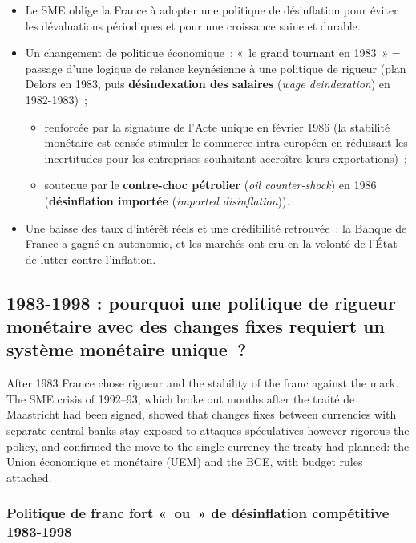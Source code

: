 \begin{itemize}
  \item Le SME oblige la France à adopter une politique de désinflation pour éviter les
    dévaluations périodiques et pour une croissance saine et durable.
  \item Un changement de politique économique~: «~le grand tournant en 1983~» = passage
    d'une logique de relance keynésienne à une politique de rigueur (plan Delors en
    1983, puis \textbf{désindexation des salaires} (\textit{wage deindexation}) en
    1982-1983)~;
    \begin{itemize}
      \item renforcée par la signature de l'Acte unique en février 1986 (la stabilité
        monétaire est censée stimuler le commerce intra-européen en réduisant les
        incertitudes pour les entreprises souhaitant accroître leurs exportations)~;
      \item soutenue par le \textbf{contre-choc pétrolier} (\textit{oil counter-shock})
        en 1986 (\textbf{désinflation importée} (\textit{imported disinflation})).
    \end{itemize}
  \item Une baisse des taux d'intérêt réels et une crédibilité retrouvée~: la Banque de
    France a gagné en autonomie, et les marchés ont cru en la volonté de l'État de
    lutter contre l'inflation.
\end{itemize}

\subsection{1983-1998 : pourquoi une politique de rigueur monétaire avec des changes fixes requiert un système monétaire unique~?}

After 1983 France chose rigueur and the stability of the franc against the mark. The
SME crisis of 1992--93, which broke out months after the traité de Maastricht had been
signed, showed that changes fixes between currencies with separate central banks stay
exposed to attaques spéculatives however rigorous the policy, and confirmed the move to
the single currency the treaty had planned: the Union économique et monétaire (UEM) and
the BCE, with budget rules attached.

\subsubsection{Politique de franc fort «~ou~» de désinflation compétitive 1983-1998}

